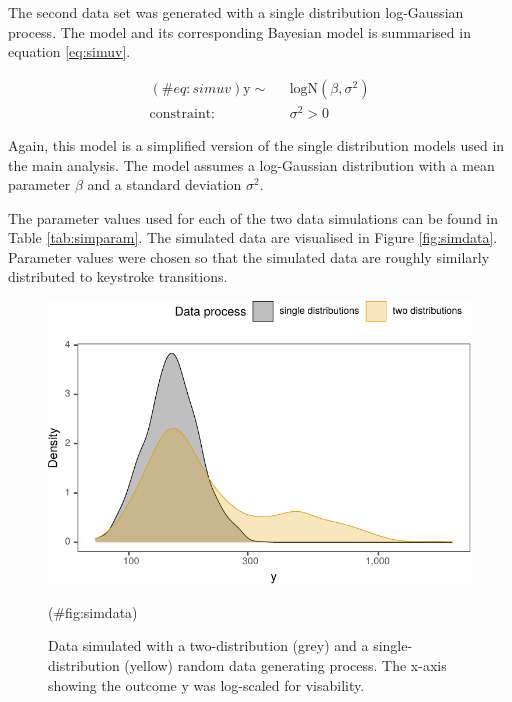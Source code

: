 \begin{appendix}
The second data set was generated with a single distribution
log-Gaussian process. The model and its corresponding Bayesian model is
summarised in equation \ref{eq:simuv}.

\begin{equation}
\begin{aligned}
(\#eq:simuv)
\text{y} \sim\text{ }& \text{logN}(\beta, \sigma^2)\\
\text{constraint: } & \sigma^2>0
\end{aligned}
\end{equation}

Again, this model is a simplified version of the single distribution
models used in the main analysis. The model assumes a log-Gaussian
distribution with a mean parameter \(\beta\) and a standard deviation
\(\sigma^2\).

The parameter values used for each of the two data simulations can be
found in Table \ref{tab:simparam}. The simulated data are visualised in
Figure \ref{fig:simdata}. Parameter values were chosen so that the
simulated data are roughly similarly distributed to keystroke
transitions.

\begin{figure}

{\centering \includegraphics{manuscript_files/figure-latex/simdata-1} 

}

\caption{Data simulated with a two-distribution (grey) and a single-distribution (yellow) random data generating process. The x-axis showing the outcome y was log-scaled for visability.}(\#fig:simdata)
\end{figure}


\end{appendix}
